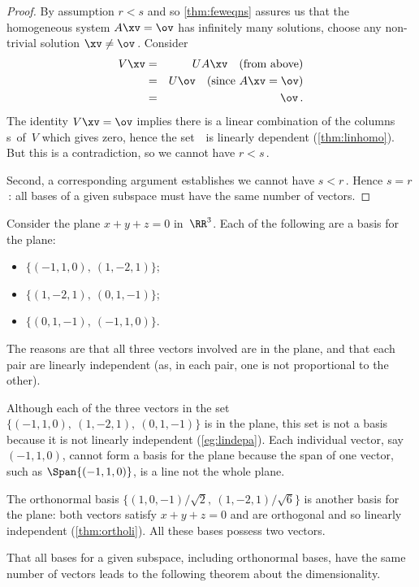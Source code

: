 \begin{proof}
By assumption \(r<s\) and so \autoref{thm:feweqns} assures us that the homogeneous system \(A\xv=\ov\) has infinitely many solutions, choose any non-trivial solution \(\xv\neq\ov\)\,.
Consider 
\begin{eqnarray*}
V\xv&=& UA\xv\quad(\text{from above})
\\&=&U\ov\quad(\text{since }A\xv=\ov)
\\&=&\ov\,.
\end{eqnarray*}
The identity \(V\xv=\ov\) implies there is a linear combination of the columns \hlist\vv s\ of~\(V\) which gives zero, hence the set~\cV\ is linearly dependent (\autoref{thm:linhomo}).  
But this is a contradiction, so we cannot have \(r<s\)\,.

Second, a corresponding argument establishes we cannot have \(s<r\)\,.
Hence \(s=r\)\,: all bases of a given subspace must have the same number of vectors.
\end{proof}



\begin{example} \label{eg:samedi}
Consider the plane \(x+y+z=0\) in~\(\RR^3\).
Each of the following are a basis for the plane:
\begin{itemize}
\item \(\{(-1,1,0),\ (1,-2,1)\}\);
\item \(\{(1,-2,1),\ (0,1,-1)\}\); 
\item \(\{(0,1,-1),\ (-1,1,0)\}\).
\end{itemize}
The reasons are that all three vectors involved are in the plane, and that each pair are linearly independent (as, in each pair, one is not proportional to the other).

Although each of the three vectors in the set \(\{(-1,1,0),\ (1,-2,1),\ (0,1,-1)\}\) is in the plane, this set is not a basis because it is not linearly independent (\autoref{eg:lindepa}).
Each individual vector, say \((-1,1,0)\), cannot form a basis for the plane because the span of one vector, such as \(\Span\{(-1,1,0)\}\), is a line not the whole plane.

The orthonormal basis \(\big\{(1,0,-1)/\sqrt2,\ (1,-2,1)/\sqrt6\big\}\) is another basis for the plane: both vectors satisfy \(x+y+z=0\) and are orthogonal and so linearly independent (\autoref{thm:ortholi}).  
All these bases possess two vectors.
\end{example}

That all bases for a given subspace, including orthonormal bases, have the same number of vectors leads to the following theorem about the dimensionality.

